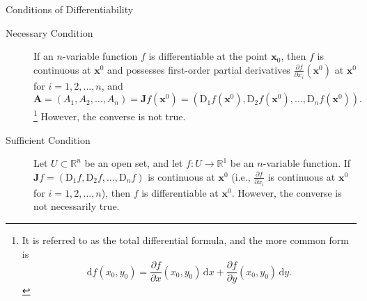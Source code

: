 \documentclass[11pt]{elegantbook}
\begin{document}
\begin{theorem}{Conditions of Differentiability}
    \begin{description}
        \item[Necessary Condition] If an \(n\)-variable function \(f\) is differentiable at the point \(\boldsymbol{x}_{0}\), 
        then \(f\) is continuous at \(\boldsymbol{x}^{0}\) and 
        possesses first-order partial derivatives \(\frac{\partial f}{\partial x_{i}}(\boldsymbol{x}^{0})\) 
        at \(\boldsymbol{x}^{0}\) for \(i = 1, 2, \dots, n\), and
        \[
        \boldsymbol{A} = \left( A_{1}, A_{2}, \dots, A_{n} \right)  = \boldsymbol{J}f(\boldsymbol{x}^{0}) = 
        \left(\mathrm{D}_{1}f(\boldsymbol{x}^{0}), \mathrm{D}_{2}f(\boldsymbol{x}^{0}), \dots, \mathrm{D}_{n}f(\boldsymbol{x}^{0}) \right).
        \]\footnote{
            It is referred to as the total differential formula, and the more common form is
            \[
                \mathrm{d}f(x_{0},y_{0})=
                \frac{\partial f}{\partial x}(x_{0},y_{0})\,\mathrm{d}x+\frac{\partial f}{\partial y}(x_{0},y_{0})\,\mathrm{d}y.
            \]
        }
        However, the converse is not true.
        \item[Sufficient Condition] Let \(U \subset \mathbb{R}^n\) be an open set, 
        and let \(f: U \to \mathbb{R}^1\) be an \(n\)-variable function. If \(\boldsymbol{J}f = \left( \mathrm{D}_{1}f, \mathrm{D}_{2}f, \dots, \mathrm{D}_{n}f \right)\) 
        is continuous at \(\boldsymbol{x}^{0}\) 
        (i.e., \(\frac{\partial f}{\partial x_{i}}\) is continuous at \(\boldsymbol{x}^{0}\) for \(i = 1, 2, \dots, n\)), 
        then \(f\) is differentiable at \(\boldsymbol{x}^{0}\). 
        However, the converse is not necessarily true.
    \end{description}    
\end{theorem}
\end{document}
